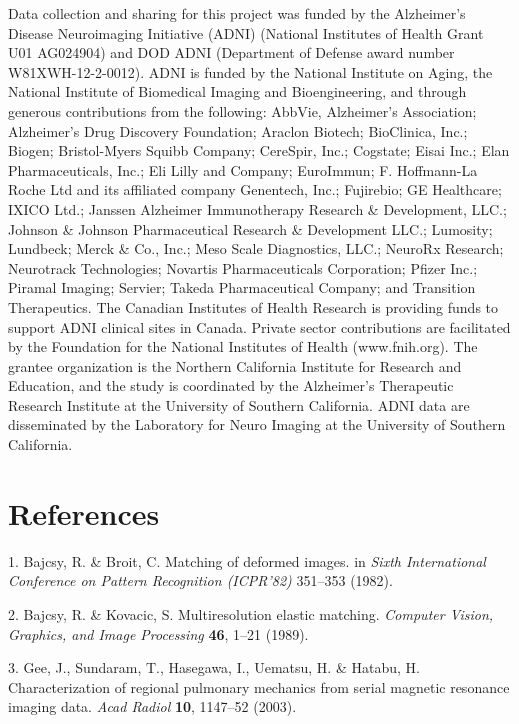 \documentclass[12pt,]{article}
\begin{document}
Data collection and sharing for this project was funded by the
Alzheimer's Disease Neuroimaging Initiative (ADNI) (National Institutes
of Health Grant U01 AG024904) and DOD ADNI (Department of Defense award
number W81XWH-12-2-0012). ADNI is funded by the National Institute on
Aging, the National Institute of Biomedical Imaging and Bioengineering,
and through generous contributions from the following: AbbVie,
Alzheimer's Association; Alzheimer's Drug Discovery Foundation; Araclon
Biotech; BioClinica, Inc.; Biogen; Bristol-Myers Squibb Company;
CereSpir, Inc.; Cogstate; Eisai Inc.; Elan Pharmaceuticals, Inc.; Eli
Lilly and Company; EuroImmun; F. Hoffmann-La Roche Ltd and its
affiliated company Genentech, Inc.; Fujirebio; GE Healthcare; IXICO
Ltd.; Janssen Alzheimer Immunotherapy Research \& Development, LLC.;
Johnson \& Johnson Pharmaceutical Research \& Development LLC.;
Lumosity; Lundbeck; Merck \& Co., Inc.; Meso Scale Diagnostics, LLC.;
NeuroRx Research; Neurotrack Technologies; Novartis Pharmaceuticals
Corporation; Pfizer Inc.; Piramal Imaging; Servier; Takeda
Pharmaceutical Company; and Transition Therapeutics. The Canadian
Institutes of Health Research is providing funds to support ADNI
clinical sites in Canada. Private sector contributions are facilitated
by the Foundation for the National Institutes of Health (www.fnih.org).
The grantee organization is the Northern California Institute for
Research and Education, and the study is coordinated by the Alzheimer's
Therapeutic Research Institute at the University of Southern California.
ADNI data are disseminated by the Laboratory for Neuro Imaging at the
University of Southern California. \newpage

\hypertarget{references}{%
\section*{References}\label{references}}

\hypertarget{refs}{}
\leavevmode\hypertarget{ref-Bajcsy:1982aa}{}%
1. Bajcsy, R. \& Broit, C. Matching of deformed images. in \emph{Sixth
International Conference on Pattern Recognition (ICPR'82)} 351--353
(1982).

\leavevmode\hypertarget{ref-Bajcsy:1989aa}{}%
2. Bajcsy, R. \& Kovacic, S. Multiresolution elastic matching.
\emph{Computer Vision, Graphics, and Image Processing} \textbf{46},
1--21 (1989).

\leavevmode\hypertarget{ref-Gee:2003aa}{}%
3. Gee, J., Sundaram, T., Hasegawa, I., Uematsu, H. \& Hatabu, H.
Characterization of regional pulmonary mechanics from serial magnetic
resonance imaging data. \emph{Acad Radiol} \textbf{10}, 1147--52 (2003).
\end{document}

